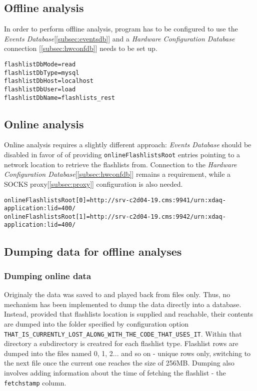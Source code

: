 \subsection{Offline analysis}
In order to perform offline analysis, program has to be configured to use the \emph{Events Database}[\ref{subsec:eventsdb}] and a \emph{Hardware Configuration Database} connection [\ref{subsec:hwconfdb}] needs to be set up.

\begin{lstlisting}
flashlistDbMode=read
flashlistDbType=mysql
flashlistDbHost=localhost
flashlistDbUser=load
flashlistDbName=flashlists_rest
\end{lstlisting}


\subsection{Online analysis}
Online analysis requires a slightly different approach: \emph{Events Database} should be disabled in favor of of providing \texttt{onlineFlashlistsRoot} entries pointing to a network location to retrieve the flashlists from. 
Connection to the \emph{Hardware Configuration Database}[\ref{subsec:hwconfdb}] remains a requirement, while a SOCKS proxy[\ref{subsec:proxy}] configuration is also needed.

\begin{lstlisting}[caption={Sample options for fetching flashlists over the network}]
onlineFlashlistsRoot[0]=http://srv-c2d04-19.cms:9941/urn:xdaq-application:lid=400/
onlineFlashlistsRoot[1]=http://srv-c2d04-19.cms:9942/urn:xdaq-application:lid=400/
\end{lstlisting}


\subsection{Dumping data for offline analyses}
\subsubsection{Dumping online data}
Originaly the data was saved to and played back from files only. Thus, no mechanism has been implemented to dump the data directly into a database. Instead, provided that flashlists location is supplied and reachable, their contents are dumped into the folder specified by configuration option \texttt{THAT\_IS\_CURRENTLY\_LOST\_ALONG\_WITH\_THE\_CODE\_THAT\_USES\_IT}. Within that directory a subdirectory is creatred for each flashlist type. Flashlist rows are dumped into the files named 0, 1, 2... and so on - unique rows only, switching to the next file once the current one reaches the size of 256MB. Dumping also involves adding information about the time of fetching the flashlist - the \texttt{fetchstamp} column.


